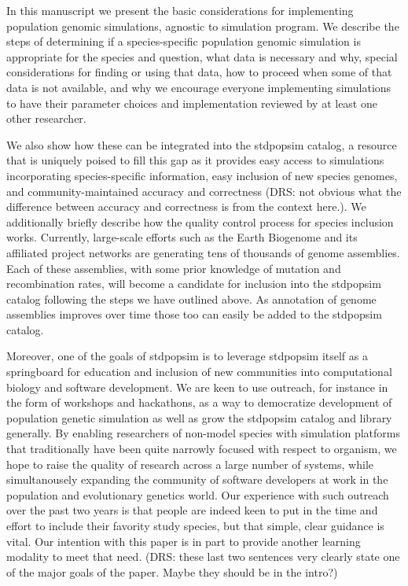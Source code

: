 \documentclass[hidelinks]{article}
\begin{document}
In this manuscript we present the basic considerations for implementing
population genomic simulations, agnostic to simulation program. We
describe the steps of determining if a species-specific population
genomic simulation is appropriate for the species and question, what
data is necessary and why, special considerations for finding or using
that data, how to proceed when some of that data is not available,
and why we encourage everyone implementing simulations to have their
parameter choices and implementation reviewed by at least one other
researcher.

We also show how these can be integrated into the stdpopsim catalog, a
resource that is uniquely poised to fill this gap as it provides easy
access to simulations incorporating species-specific information,
easy inclusion of new species genomes, and community-maintained accuracy
and correctness (DRS: not obvious what the difference between accuracy
and correctness is from the context here.).
We additionally briefly describe how the quality control 
process for species inclusion works. Currently, large-scale efforts such as the Earth Biogenome
and its affiliated project networks are generating tens of thousands of genome
assemblies. Each of these assemblies, with some prior knowledge of mutation and
recombination rates, will become a candidate for inclusion into the
stdpopsim catalog following the steps we have outlined above. As
annotation of genome assemblies improves over time those too can easily
be added to the stdpopsim catalog.

Moreover, one of the goals of stdpopsim is to leverage stdpopsim itself
as a springboard for education and inclusion of new communities into
computational biology and software development. We are keen to use
outreach, for instance in the form of workshops and hackathons, as a way
to democratize development of population genetic simulation as well as
grow the stdpopsim catalog and library generally. By enabling
researchers of non-model species with simulation platforms that
traditionally have been quite narrowly focused with respect to organism,
we hope to raise the quality of research across a large number of
systems, while simultanousely expanding the community of software
developers at work in the population and evolutionary genetics world.
Our experience with such outreach over the past two years is that people
are indeed keen to put in the time and effort to include their favority
study species, but that simple, clear guidance is vital. Our
intention with this paper is in part to provide another learning
modality to meet that need. (DRS: these last two sentences very
clearly state one of the major goals of the paper. Maybe they should be
in the intro?)
\end{document}
